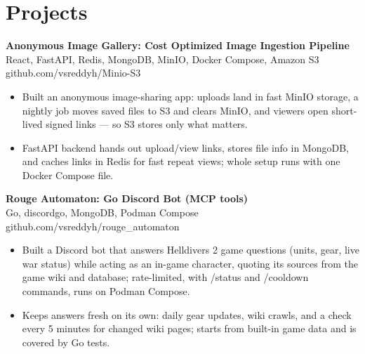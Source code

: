 \documentclass[a4paper,11pt]{article}
\newcommand{\resumeItem}[1]{\item \small{#1}}
\newcommand{\resumeSubheading}[4]{%
  \textbf{#1} \hfill \textbf{#2} \\
{#3} \hfill {#4}
}
\newcommand{\resumeSubHeadingListStart}{\begin{itemize}}
\newcommand{\resumeSubHeadingListEnd}{\end{itemize}}
\begin{document}
\section*{Projects}

\resumeSubheading
{Anonymous Image Gallery: Cost Optimized Image Ingestion Pipeline}{}{React, FastAPI, Redis, MongoDB, MinIO, Docker Compose, Amazon S3}{github.com/vsreddyh/Minio-S3}
\resumeSubHeadingListStart
\resumeItem{Built an anonymous image-sharing app: uploads land in fast MinIO storage, a nightly job moves saved files to S3 and clears MinIO, and viewers open short-lived signed links — so S3 stores only what matters.}
\resumeItem{FastAPI backend hands out upload/view links, stores file info in MongoDB, and caches links in Redis for fast repeat views; whole setup runs with one Docker Compose file.}
\resumeSubHeadingListEnd

\resumeSubheading
{Rouge Automaton: Go Discord Bot (MCP tools)}{}{Go, discordgo, MongoDB, Podman Compose}{github.com/vsreddyh/rouge\_automaton}
\resumeSubHeadingListStart
\resumeItem{Built a Discord bot that answers Helldivers 2 game questions (units, gear, live war status) while acting as an in-game character, quoting its sources from the game wiki and database; rate-limited, with /status and /cooldown commands, runs on Podman Compose.}
\resumeItem{Keeps answers fresh on its own: daily gear updates, wiki crawls, and a check every 5 minutes for changed wiki pages; starts from built-in game data and is covered by Go tests.}
\resumeSubHeadingListEnd

\vspace{-0.6em}
\end{document}

